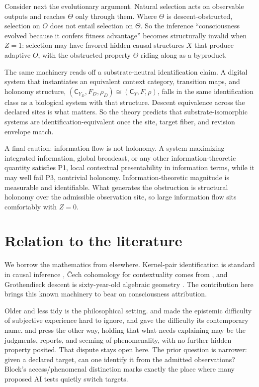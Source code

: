 \documentclass[11pt]{article}
\begin{document}
Consider next the evolutionary argument. Natural selection acts on observable
outputs and reaches $\Theta$ only through them. Where $\Theta$ is
descent-obstructed, selection on $O$ does not entail selection on $\Theta$. So
the inference ``consciousness evolved because it confers fitness advantage''
becomes structurally invalid when $Z = 1$: selection may have favored hidden
causal structures $X$ that produce adaptive $O$, with the obstructed property
$\Theta$ riding along as a byproduct.

The same machinery reads off a substrate-neutral identification claim. A digital
system that instantiates an equivalent context category, transition maps, and
holonomy structure,
$(\mathsf{C}_{Y_D}, F_D, \rho_D) \cong (\mathsf{C}_Y, F, \rho)$, falls in the
same identification class as a biological system with that structure. Descent
equivalence across the declared sites is what matters. So the theory predicts
that substrate-isomorphic systems are identification-equivalent once the site,
target fiber, and revision envelope match.

A final caution: information flow is not holonomy. A system maximizing integrated
information, global broadcast, or any other information-theoretic quantity
satisfies P1, local contextual presentability in information terms, while it may
well fail P3, nontrivial holonomy. Information-theoretic magnitude is measurable
and identifiable. What generates the obstruction is structural holonomy over the
admissible observation site, so large information flow sits comfortably with
$Z = 0$.

\section{Relation to the literature}
\label{sec:literature}

We borrow the mathematics from elsewhere. Kernel-pair identification is
standard in causal inference \citep{pearl2009}, \v{C}ech cohomology for
contextuality comes from \citet{abramsky2011}, and Grothendieck descent is
sixty-year-old algebraic geometry \citep{grothendieck1971sga}. The contribution here
brings this known machinery to bear on consciousness attribution.

Older and less tidy is the philosophical setting. \citet{nagel1974} and
\citet{levine1983} made the epistemic difficulty of subjective experience hard
to ignore, and \citet{chalmers1995} gave the difficulty its contemporary name.
\citet{dennett1991} and \citet{frankish2016} press the other way, holding that
what needs explaining may be the judgments, reports, and seeming of
phenomenality, with no further hidden property posited. That dispute stays open
here. The prior question is narrower: given a declared target, can one identify it
from the admitted observations? Block's access/phenomenal distinction
\citep{block1995} marks exactly the place where many
proposed AI tests quietly switch targets.
\end{document}
